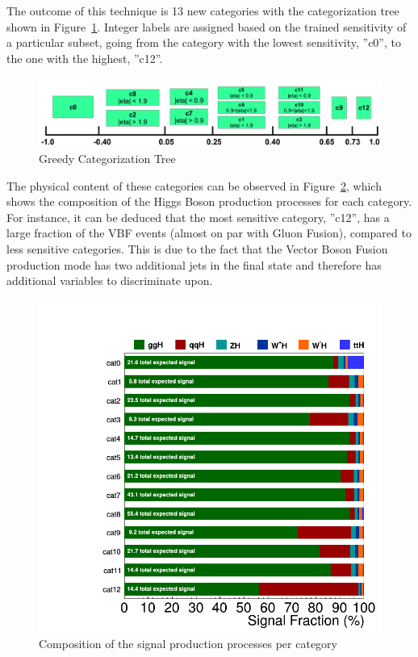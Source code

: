 The outcome of this technique is 13 new categories with the categorization tree shown in Figure~\ref{fig:higgs_categorization_bdtcategories}. Integer labels are assigned based on the trained sensitivity of a particular subset, going from the category with the lowest sensitivity, ''c0'', to the one with the highest, ''c12''.
\begin{figure}[hbtp]
  \centering
  \includegraphics[width=1.0\linewidth]{figures/bdt_cats/final_categories.png}
  \caption{Greedy Categorization Tree}
  \label{fig:higgs_categorization_bdtcategories}
\end{figure}

The physical content of these categories can be observed in Figure~\ref{fig:higgs_categorization_physicscontent}, which shows the composition of the Higgs Boson production processes for each category. For instance, it can be deduced that the most sensitive category, ''c12'', has a large fraction of the VBF events (almost on par with Gluon Fusion), compared to less sensitive categories. This is due to the fact that the Vector Boson Fusion production mode has two additional jets in the final state and therefore has additional variables to discriminate upon.
\begin{figure}[hbtp]
  \centering
  \includegraphics[width=0.8\linewidth]{figures/signal_model/signal_composition.png}
  \caption{Composition of the signal production processes per category}
  \label{fig:higgs_categorization_physicscontent}
\end{figure}

